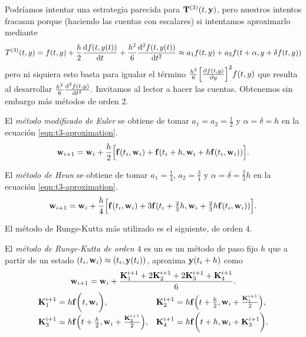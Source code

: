 Podríamos intentar una estrategia parecida para $\vb{T}^{(3)}(t, \vb{y}{})$,
pero nuestros intentos fracasan porque
(haciendo las cuentas con escalares)
si intentamos aproximarlo mediante
\begin{equation}\label{eqn:t3-aproximation}
    T^{(3)}(t,y) =
    f(t,y) + \frac{h}{2}\dv{f(t, y(t))}{t}
        + \frac{h^2}{6}\dv[2]{f(t, y(t))}{t} \approx
    a_1f(t,y) + a_2f(t + \alpha, y + \delta f(t,y))
\end{equation}
pero ni siquiera esto basta para igualar el término
$\frac{h^2}{6}\qty[\pdv{f(t, y)}{y}]^2f(t,y)$
que resulta al desarrollar $\frac{h^2}{6}\dv[2]{f(t, y)}{t}$.
Invitamos al lector a hacer las cuentas.
Obtenemos sin embargo más métodos de orden $2$.

\begin{method}
    El \emph{método modificado de Euler} se obtiene de
    tomar $a_1 = a_2 = \frac{1}{2}$ y $\alpha = \delta = h$
    en la ecuación  \eqref{eqn:t3-aproximation}.
    \begin{equation*}
        \vb{w}{}_{i+1} = \vb{w}{}_i + \frac{h}{2}\qty\Big[
            \vb{f}{}(t_i, \vb{w}{}_i) + \vb{f}{}(t_i + h, \vb{w}{}_i + h\vb{f}{}(t_i,\vb{w}{}_i))
        ].
    \end{equation*}
\end{method}

\begin{method}
    El \emph{método de Heun} se obtiene de tomar $a_1 = \frac{1}{4}$,
    $a_2 = \frac{3}{4}$ y $\alpha = \delta = \frac{2}{3}h$
    en la ecuación \eqref{eqn:t3-aproximation}.
    \begin{equation*}
        \vb{w}{}_{i+1} = \vb{w}{}_i + \frac{h}{4}\qty\Big[
            \vb{f}{}(t_i, \vb{w}{}_i) +
            3\vb{f}{}(t_i + \tfrac{2}{3}h, \vb{w}{}_i + \tfrac{2}{3}h\vb{f}{}(t_i, \vb{w}{}_i))
        ].
    \end{equation*}

\end{method}

El método de Runge-Kutta más utilizado es el siguiente, de orden $4$.

\begin{method}\label{met:rk4}
    \newcommand{\K}{\vb{K}}

    El \emph{método de Runge-Kutta de orden $4$}
    es un es un método de paso fijo $h$ que
    a partir de un estado $(t_i, \vb{w}{}_i) \approx (t_i, \vb{y}{}(t_i))$,
    aproxima $\vb{y}{}(t_i + h)$ como
    \begin{gather*}
        \vw_{i+1} = \vw_i + \frac{
            \K_1^{i+1} + 2\K_2^{i+1} + 2\K_3^{i+1} + \K_4^{i+1}
        }{6}. \\
        \begin{array}{ll}
        \K_1^{i+1} = h\vf\qty\bigg(t, \vw_i), &
        \K_2^{i+1} = h\vf\qty(t + \frac{h}{2}, \vw_i+ \frac{\K_1^{i+1}}{2}), \\
        \K_3^{i+1} = h\vf\qty(t + \frac{h}{2}, \vw_i+ \frac{\K_2^{i+1}}{2}), &
        \K_4^{i+1} = h\vf\qty\bigg(t + h, \vw_i + \K_3^{i+1}).
        \end{array}
    \end{gather*}
\end{method}

